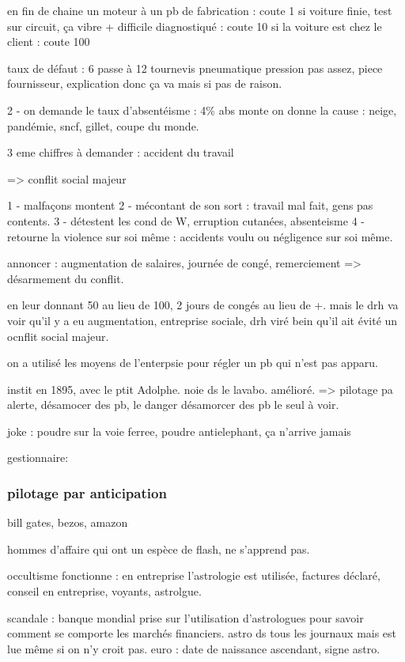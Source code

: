 \documentclass[a4paper,12pt]{article}
\begin{document}
en fin de chaine un moteur à un pb de fabrication : coute 1
si voiture finie, test sur circuit, ça vibre + difficile diagnostiqué : coute 10
si la voiture est chez le client : coute 100


taux de défaut : 6 passe à 12  tournevis pneumatique pression pas assez, piece fournisseur, 
explication donc ça va mais si pas de raison.

2 - on demande le taux d'absentéisme : 4\%
abs monte on donne la cause : neige, pandémie, sncf, gillet, coupe du monde.

3 eme chiffres à demander : accident du travail

=> conflit social majeur

1 - malfaçons montent
2 - mécontant de son sort : travail mal fait, gens pas contents.
3 - détestent les cond de W, erruption cutanées, absenteisme
4 - retourne la violence sur soi même : accidents voulu ou négligence sur soi même.

annoncer : augmentation de salaires, journée de congé, remerciement => désarmement du conflit.

en leur donnant 50 au lieu de 100, 2 jours de congés au lieu de +.
mais le drh va voir qu'il y a eu augmentation, entreprise sociale, drh viré bein qu'il ait évité
un ocnflit social majeur.

on a utilisé les moyens de l'enterpsie pour régler un pb qui n'est pas apparu.

instit en 1895, avec le ptit Adolphe. noie ds le lavabo. amélioré. 
=> pilotage pa alerte, désamocer des pb, le danger désamorcer des pb 
le seul à voir.  

joke : poudre sur la voie ferree, poudre antielephant, ça n'arrive jamais

gestionnaire:

\subsubsection{pilotage par anticipation}

bill gates,
bezos, amazon

hommes d'affaire qui ont un espèce de flash, ne s'apprend pas.

occultisme fonctionne : en entreprise l'astrologie est utilisée,
factures déclaré, conseil en entreprise, voyants, astrolgue.

scandale : banque mondial prise sur l'utilisation d'astrologues pour savoir comment se comporte
les marchés financiers. astro ds tous les journaux mais est lue même si on n'y croit pas.
euro : date de naissance ascendant, signe astro.
\end{document}
